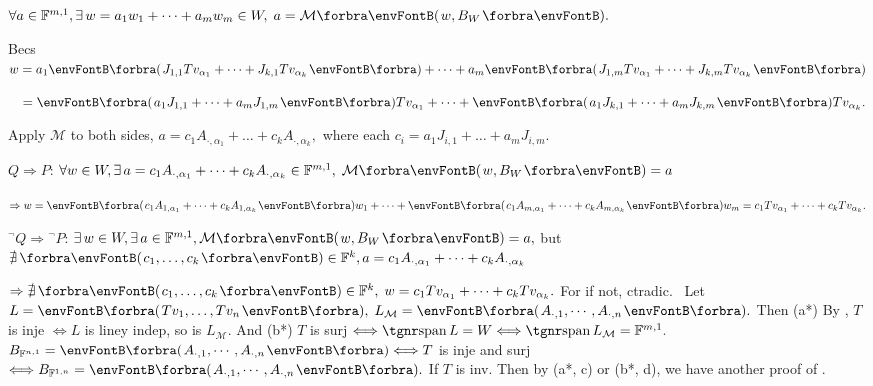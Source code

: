 $\forall a\in\Fbb^{m,1},\exists\,w=a_1w_1+\dots+a_mw_m\in W,\;a=\Mt{w,B_W}.$\par\quad\Hb
{}Becs $w=a_1\BigPar{J_{1,1}Tv_{\alpha_1}+\dots+J_{k,1}Tv_{\alpha_k}}+\dots+a_m\BigPar{J_{1,m}Tv_{\alpha_1}+\dots+J_{k,m}Tv_{\alpha_k}}$\par\vspace{2pt}\quad\Hb
{} $\Blind{w}=\BigPar{a_1J_{1,1}+\dots+a_mJ_{1,m}}Tv_{\alpha_1}+\dots+\BigPar{a_1J_{k,1}+\dots+a_mJ_{k,m}}Tv_{\alpha_k}.$\par\vspace{2pt}\quad\Hb
{}Apply $\mathcal{M}$ to both sides, $a=c_1A_{\cdot,\alpha_1}+\dots+c_kA_{\cdot,\alpha_k},$ where each $c_i=a_1J_{i,1}+\dots+a_mJ_{i,m}.$\par\vspace{6pt}\quad\Hb
$Q\Rightarrow P:$\,\;$\forall w\in W,\exists\,a=c_1A_{\cdot,{\alpha_1}}+\dots+c_kA_{\cdot,\alpha_k}\in\Fbb^{m,1},\;\Mt{w,B_W}=a$\par\quad\Hb
{}$\Rightarrow w=\BigPar{c_1A_{1,{\alpha_1}}+\dots+c_kA_{1,{\alpha_k}}}w_1+\dots+\BigPar{c_1A_{m,{\alpha_1}}+\dots+c_kA_{m,{\alpha_k}}}w_m=c_1Tv_{\alpha_1}+\dots+c_kTv_{\alpha_k}.$\vspace{6pt}\par\quad\Hb
${}{^\neg}Q\Rightarrow{}{^\neg}P:$\,\;$\exists\,w\in W,\exists\,a\in\Fbb^{m,1},\Mt{w,B_W}=a,$ but $\nexists\,\Par{c_1,\dots,c_k}\in\Fbb^k,a=c_1A_{\cdot,\alpha_1}+\dots+c_kA_{\cdot,\alpha_k}$\par\quad\Hb
{}$\Rightarrow\nexists\,\Par{c_1,\dots,c_k}\in\Fbb^k,\;w=c_1Tv_{\alpha_1}+\dots+c_kTv_{\alpha_k}.$ For if not, ctradic.\PfEnd\vspace{6pt}
\Note \,\,\,Let $L=\BigPar{Tv_1,\dots,Tv_n},\;L_{\mathcal{M}}=\BigPar{A_{\cdot,1},\cdots,A_{\cdot,n}}.$\parNot
Then (a*) By , $T$ is inje $\Longleftrightarrow L$ is liney indep, so is $L_{\mathcal{M}}$.\parNot
And (b*) $T$ is surj $\Longleftrightarrow\Spn L=W\Longleftrightarrow\Spn L_{\mathcal{M}}=\Fbb^{m,1}.$\parNot
\hypertarget{3C4e17}{\ACoro }$B_{\Fbb^{n,1}}=\BigPar{A_{\cdot,1},\cdots,A_{\cdot,n}}\Longleftrightarrow T$ is inje and surj $\Longleftrightarrow B_{\Fbb^{1,n}}=\BigPar{A_{\cdot,1},\cdots,A_{\cdot,n}}.$\parNot
\AComm If $T$ is inv. Then by (a*, c) or (b*, d), we have another proof of \COROLLARY.\parNot\IndentComment
